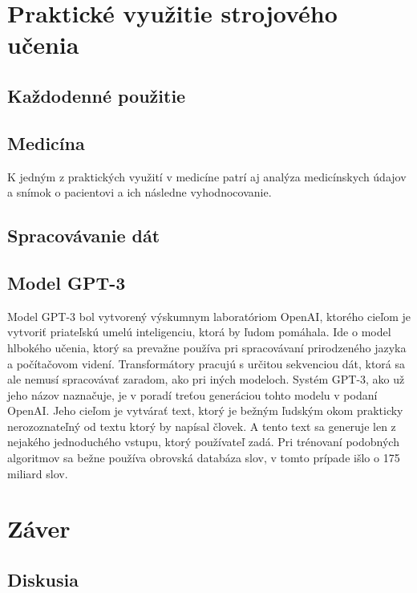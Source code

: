 \documentclass[8pt,oneside,slovak,a4paper]{article}
\begin{document}
\section{Praktické využitie strojového učenia} \label{vyuzitie}
\subsection{Každodenné použitie}
\subsection{Medicína}
K jedným z praktických využití v medicíne patrí aj analýza medicínskych údajov a snímok o pacientovi a ich následne vyhodnocovanie. \cite{heart_disease}
\subsection{Spracovávanie dát}
\subsection{Model GPT-3}
Model GPT-3 bol vytvorený výskumnym laboratóriom OpenAI, ktorého cieľom je vytvoriť priateľskú umelú inteligenciu, ktorá by ľudom pomáhala.\cite{GPT3} Ide o model hlbokého učenia, ktorý sa prevažne používa pri spracovávaní  prirodzeného jazyka a počítačovom videní. Transformátory pracujú s určitou sekvenciou dát, ktorá sa ale nemusí spracovávať zaradom, ako pri iných modeloch.\newline \hspace*{0.4cm} Systém GPT-3, ako už jeho názov naznačuje, je v poradí treťou generáciou tohto modelu v podaní OpenAI. Jeho cieľom je vytvárať text, ktorý je bežným ľudským okom prakticky nerozoznateľný od textu ktorý by napísal človek. A tento text sa generuje len z nejakého jednoduchého vstupu, ktorý používateľ zadá. Pri trénovaní podobných algoritmov sa bežne používa obrovská databáza slov, v tomto prípade išlo o 175 miliard slov.\cite{GPT3}

\newpage
\section{Záver} \label{zaver}
\subsection{Diskusia} \label{diskusia}


 
\end{document}
